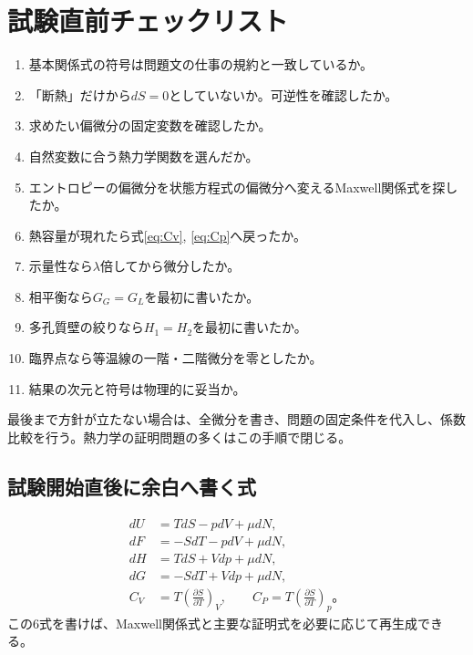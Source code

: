 \documentclass[platex,dvipdfmx,a4paper,10pt]{jsarticle}
\newcommand{\key}[1]{\begin{framed}\noindent #1\end{framed}}
\begin{document}
\newpage
\section{試験直前チェックリスト}\label{sec:checklist}
\begin{enumerate}
  \item 基本関係式の符号は問題文の仕事の規約と一致しているか。
  \item 「断熱」だけから$dS=0$としていないか。可逆性を確認したか。
  \item 求めたい偏微分の固定変数を確認したか。
  \item 自然変数に合う熱力学関数を選んだか。
  \item エントロピーの偏微分を状態方程式の偏微分へ変えるMaxwell関係式を探したか。
  \item 熱容量が現れたら式\eqref{eq:Cv}, \eqref{eq:Cp}へ戻ったか。
  \item 示量性なら$\lambda$倍してから微分したか。
  \item 相平衡なら$G_G=G_L$を最初に書いたか。
  \item 多孔質壁の絞りなら$H_1=H_2$を最初に書いたか。
  \item 臨界点なら等温線の一階・二階微分を零としたか。
  \item 結果の次元と符号は物理的に妥当か。
\end{enumerate}

\key{最後まで方針が立たない場合は、全微分を書き、問題の固定条件を代入し、係数比較を行う。熱力学の証明問題の多くはこの手順で閉じる。}

\subsection{試験開始直後に余白へ書く式}
\begin{align*}
  dU&=TdS-pdV+\mu dN,\\
  dF&=-SdT-pdV+\mu dN,\\
  dH&=TdS+Vdp+\mu dN,\\
  dG&=-SdT+Vdp+\mu dN,\\
  C_V&=T\left(\frac{\partial S}{\partial T}\right)_V,
  \qquad C_P=T\left(\frac{\partial S}{\partial T}\right)_p。
\end{align*}
この6式を書けば、Maxwell関係式と主要な証明式を必要に応じて再生成できる。
\end{document}
